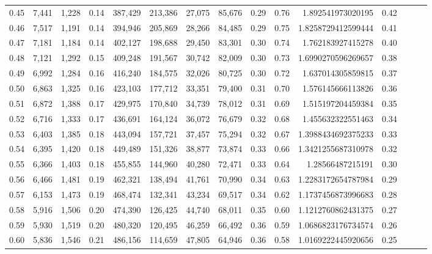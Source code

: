 \begin{tabular}{rrrrrrrrrrrrrrr}
0.45 &  7,441 &  1,228 &  0.14 &  387,429 &  213,386 &   27,075 &   85,676 &  0.29 &  0.76 &     1.892541973020195 &      0.42 \\
0.46 &  7,517 &  1,191 &  0.14 &  394,946 &  205,869 &   28,266 &   84,485 &  0.29 &  0.75 &    1.8258729412599444 &      0.41 \\
0.47 &  7,181 &  1,184 &  0.14 &  402,127 &  198,688 &   29,450 &   83,301 &  0.30 &  0.74 &     1.762183927415278 &      0.40 \\
0.48 &  7,121 &  1,292 &  0.15 &  409,248 &  191,567 &   30,742 &   82,009 &  0.30 &  0.73 &    1.6990270596269657 &      0.38 \\
0.49 &  6,992 &  1,284 &  0.16 &  416,240 &  184,575 &   32,026 &   80,725 &  0.30 &  0.72 &     1.637014305859815 &      0.37 \\
0.50 &  6,863 &  1,325 &  0.16 &  423,103 &  177,712 &   33,351 &   79,400 &  0.31 &  0.70 &     1.576145666113826 &      0.36 \\
0.51 &  6,872 &  1,388 &  0.17 &  429,975 &  170,840 &   34,739 &   78,012 &  0.31 &  0.69 &     1.515197204459384 &      0.35 \\
0.52 &  6,716 &  1,333 &  0.17 &  436,691 &  164,124 &   36,072 &   76,679 &  0.32 &  0.68 &     1.455632322551463 &      0.34 \\
0.53 &  6,403 &  1,385 &  0.18 &  443,094 &  157,721 &   37,457 &   75,294 &  0.32 &  0.67 &    1.3988434692375233 &      0.33 \\
0.54 &  6,395 &  1,420 &  0.18 &  449,489 &  151,326 &   38,877 &   73,874 &  0.33 &  0.66 &    1.3421255687310978 &      0.32 \\
0.55 &  6,366 &  1,403 &  0.18 &  455,855 &  144,960 &   40,280 &   72,471 &  0.33 &  0.64 &      1.28566487215191 &      0.30 \\
0.56 &  6,466 &  1,481 &  0.19 &  462,321 &  138,494 &   41,761 &   70,990 &  0.34 &  0.63 &    1.2283172654787984 &      0.29 \\
0.57 &  6,153 &  1,473 &  0.19 &  468,474 &  132,341 &   43,234 &   69,517 &  0.34 &  0.62 &    1.1737456873996683 &      0.28 \\
0.58 &  5,916 &  1,506 &  0.20 &  474,390 &  126,425 &   44,740 &   68,011 &  0.35 &  0.60 &    1.1212760862431375 &      0.27 \\
0.59 &  5,930 &  1,519 &  0.20 &  480,320 &  120,495 &   46,259 &   66,492 &  0.36 &  0.59 &    1.0686823176734574 &      0.26 \\
0.60 &  5,836 &  1,546 &  0.21 &  486,156 &  114,659 &   47,805 &   64,946 &  0.36 &  0.58 &    1.0169222445920656 &      0.25 \\

\end{tabular}
